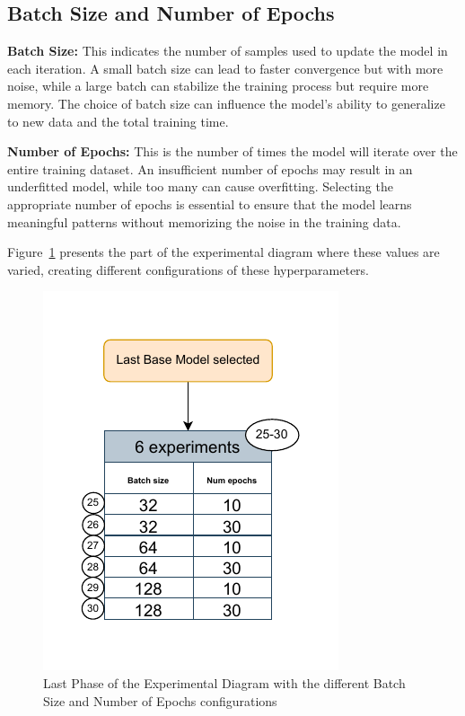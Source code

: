 \subsection{Batch Size and Number of Epochs}

\textbf{Batch Size:} This indicates the number of samples used to update the model in each iteration. A small batch size can lead to faster convergence but with more noise, while a large batch can stabilize the training process but require more memory. The choice of batch size can influence the model's ability to generalize to new data and the total training time.

\vspace{10pt}

\noindent\textbf{Number of Epochs:} This is the number of times the model will iterate over the entire training dataset. An insufficient number of epochs may result in an underfitted model, while too many can cause overfitting. Selecting the appropriate number of epochs is essential to ensure that the model learns meaningful patterns without memorizing the noise in the training data.

Figure~\ref{D5} presents the part of the experimental diagram where these values are varied, creating different configurations of these hyperparameters.

\begin{figure}[htbp]
    \centering
    \includegraphics[width=7 cm]{5_ChapterDesign/figuras/Diagrams/D5.pdf}
    \caption{Last Phase of the Experimental Diagram with the different Batch Size and Number of Epochs configurations}
    \label{D5}
\end{figure}